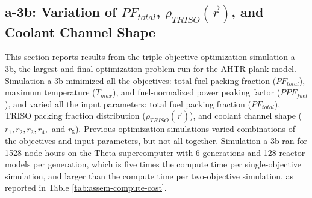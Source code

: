 \subsection{a-3b: Variation of $PF_{total}$, $\rho_{TRISO}(\vec{r})$, and Coolant 
Channel Shape}
\label{sec:a-3b}
This section reports results from the triple-objective optimization simulation a-3b, 
the largest and final optimization problem run for the \gls{AHTR} plank model. 
Simulation a-3b minimized all the objectives: total fuel packing fraction 
($PF_{total}$), maximum temperature ($T_{max}$), and fuel-normalized power 
peaking factor ($PPF_{fuel}$), and varied all the input parameters: total fuel packing 
fraction ($PF_{total}$), TRISO packing fraction distribution ($\rho_{TRISO}(\vec{r})$), 
and coolant channel shape ($r_1, r_2, r_3, r_4,$ and $r_5$).  
Previous optimization simulations varied combinations of the objectives and input 
parameters, but not all together. 
Simulation a-3b ran for 1528 node-hours on the Theta supercomputer with 6
generations and 128 reactor models per generation, which is five times the compute 
time per single-objective simulation, and larger than the compute time per 
two-objective simulation, as reported in Table \ref{tab:assem-compute-cost}. 

